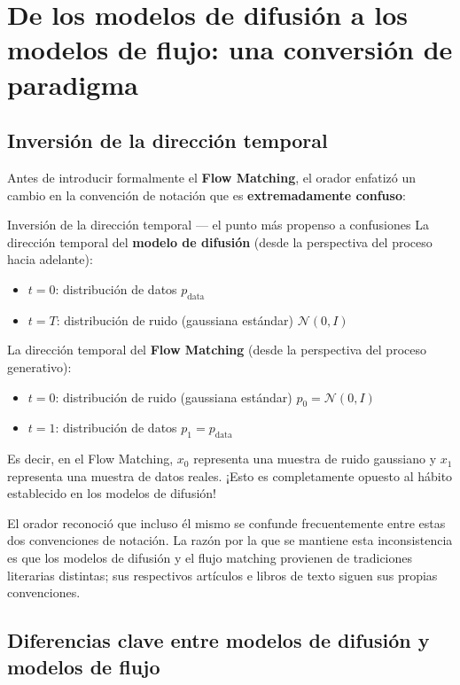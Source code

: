 \section{De los modelos de difusión a los modelos de flujo: una conversión de paradigma}

\subsection{Inversión de la dirección temporal}

Antes de introducir formalmente el \textbf{Flow Matching}, el orador enfatizó un cambio en la convención de notación que es \textbf{extremadamente confuso}:

\begin{warningbox}{Inversión de la dirección temporal — el punto más propenso a confusiones}
La dirección temporal del \textbf{modelo de difusión} (desde la perspectiva del proceso hacia adelante):
\begin{itemize}
    \item $t = 0$: distribución de datos $p_{\text{data}}$
    \item $t = T$: distribución de ruido (gaussiana estándar) $\mathcal{N}(0, I)$
\end{itemize}

La dirección temporal del \textbf{Flow Matching} (desde la perspectiva del proceso generativo):
\begin{itemize}
    \item $t = 0$: distribución de ruido (gaussiana estándar) $p_0 = \mathcal{N}(0, I)$
    \item $t = 1$: distribución de datos $p_1 = p_{\text{data}}$
\end{itemize}

Es decir, en el Flow Matching, $x_0$ representa una muestra de ruido gaussiano y $x_1$ representa una muestra de datos reales. ¡Esto es completamente opuesto al hábito establecido en los modelos de difusión!
\end{warningbox}

El orador reconoció que incluso él mismo se confunde frecuentemente entre estas dos convenciones de notación. La razón por la que se mantiene esta inconsistencia es que los modelos de difusión y el flujo matching provienen de tradiciones literarias distintas; sus respectivos artículos e libros de texto siguen sus propias convenciones.

\subsection{Diferencias clave entre modelos de difusión y modelos de flujo}

